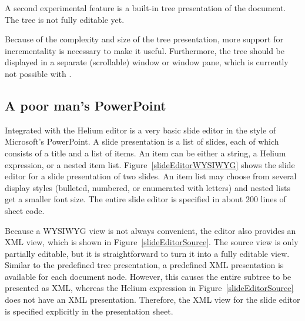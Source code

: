  \then
{}




A second experimental feature is a built-in tree presentation of the document. The tree is not fully editable yet.


Because of the complexity and size of the tree presentation, more support for incrementality is necessary to make it useful. Furthermore, the tree should be displayed in a separate (scrollable) window or window pane, which is currently not possible with {\Xprez}.



\subsection{A poor man's PowerPoint}

Integrated with the Helium editor is a very basic slide editor in the style of Microsoft's PowerPoint. A slide presentation is a list of slides, each of which consists of a title and a list of items. An item can be either a string, a Helium expression, or a nested item list. Figure~\ref{slideEditorWYSIWYG} shows the slide editor for a slide presentation of two slides. An item list may choose from several display styles (bulleted, numbered, or enumerated with letters) and nested lists get a smaller font size. The entire slide editor is specified in about 200 lines of sheet code.

Because a WYSIWYG view is not always convenient, the editor also provides an XML view, which is shown in Figure~\ref{slideEditorSource}. The source view is only partially editable, but it is straightforward to turn it into a fully editable view. Similar to the predefined tree presentation, a predefined XML presentation is available for each document node. However, this causes the entire subtree to be presented as XML, whereas the Helium expression in Figure~\ref{slideEditorSource} does not have an XML presentation. Therefore, the XML view for the slide editor is  specified explicitly in the presentation sheet.

